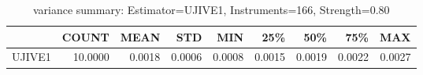 \begin{table}[ht]
\centering
\caption{variance summary: Estimator=UJIVE1, Instruments=166, Strength=0.80}
\begin{tabular}{lrrrrrrrr}
\toprule
 & COUNT & MEAN & STD & MIN & 25\% & 50\% & 75\% & MAX \\
\midrule
UJIVE1 & 10.0000 & 0.0018 & 0.0006 & 0.0008 & 0.0015 & 0.0019 & 0.0022 & 0.0027 \\
\bottomrule
\end{tabular}
\end{table}
